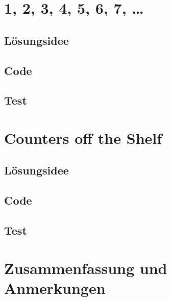 \documentclass[german,notitlepage,smartquotes]{hgbreport}
\begin{document}

\section{1, 2, 3, 4, 5, 6, 7, \dots}

\subsection{Lösungsidee}

\subsection{Code}

\subsection{Test}


\section{Counters off the Shelf}

\subsection{Lösungsidee}

\subsection{Code}

\subsection{Test}


\section*{Zusammenfassung und Anmerkungen}




\end{document}

